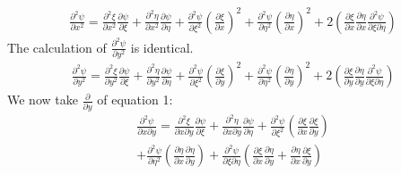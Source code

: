 \documentclass[a4paper,10pt]{article}
\numberwithin{equation}{section}
\begin{document}
\begin{gather}
\frac{\partial ^2 \psi}{\partial x^2}=\frac{\partial ^2 \xi}{\partial x^2}\frac{\partial \psi}{\partial \xi}+\frac{\partial ^2 \eta}{\partial x^2}
\frac{\partial \psi}{\partial \eta}
+\frac{\partial ^2 \psi}{\partial \xi ^2}(\frac{\partial \xi}{\partial x})^2+\frac{\partial ^2 \psi}{\partial \eta ^2}(\frac{\partial \eta}{\partial x})^2
+2(\frac{\partial \xi}{\partial x}\frac{\partial \eta}{\partial x}\frac{\partial ^2 \psi}{\partial \xi \partial \eta})
\end{gather}
The calculation of $\frac{\partial ^2 \psi }{\partial y^2}$ is identical.
\begin{gather}
\frac{\partial ^2 \psi}{\partial y^2}=\frac{\partial ^2 \xi}{\partial y^2}\frac{\partial \psi}{\partial \xi}+\frac{\partial ^2 \eta}{\partial y^2}\frac{\partial \psi}{\partial \eta}
+\frac{\partial ^2 \psi}{\partial \xi ^2}(\frac{\partial \xi}{\partial y})^2+\frac{\partial ^2 \psi}{\partial \eta ^2}(\frac{\partial \eta}{\partial y})^2
+2(\frac{\partial \xi}{\partial y}\frac{\partial \eta}{\partial y}\frac{\partial ^2 \psi}{\partial \xi \partial \eta})
\end{gather}
We now take $\frac{\partial}{\partial y}$ of equation 1:
\begin{multline}
 \frac{\partial ^2\psi}{\partial x \partial y}=\frac{\partial ^2\xi}{\partial x \partial y}\frac{\partial \psi}{\partial \xi}
 +\frac{\partial ^2 \eta}{\partial x \partial y}\frac{\partial \psi}{\partial \eta}
 +\frac{\partial^2 \psi}{\partial \xi ^2}(\frac{\partial \xi}{\partial x}\frac{\partial \xi}{\partial y})\\
 +\frac{\partial^2 \psi}{\partial \eta ^2}(\frac{\partial \eta}{\partial x}\frac{\partial \eta}{\partial y})
 +\frac{\partial ^2 \psi}{\partial \xi \partial \eta}(\frac{\partial \xi}{\partial x}\frac{\partial \eta}{\partial y}+\frac{\partial \eta}{\partial x}\frac{\partial \xi}{\partial y} ) 
\end{multline}
\end{document}
